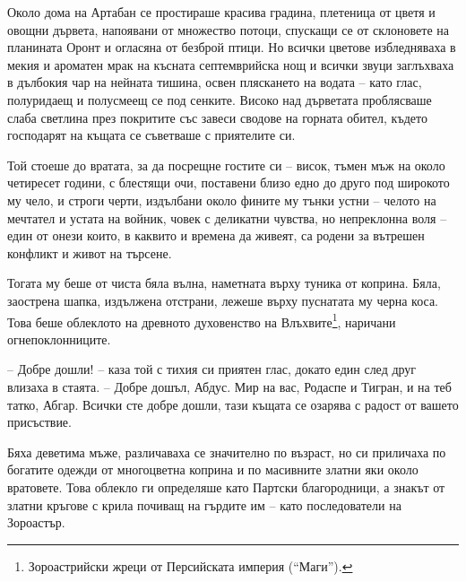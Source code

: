 Около дома на Артабан се простираше красива градина, плетеница от цветя и овощни
дървета, напоявани от множество потоци, спускащи се от склоновете на планината
Оронт и огласяна от безброй птици. Но всички цветове избледняваха в мекия и
ароматен мрак на късната септемврийска нощ и всички звуци заглъхваха в дълбокия
чар на нейната тишина, освен пляскането на водата -- като глас, полуридаещ и
полусмеещ се под сенките. Високо над дърветата проблясваше слаба светлина през
покритите със завеси сводове на горната обител, където господарят на къщата се
съветваше с приятелите си.

Той стоеше до вратата, за да посрещне гостите си -- висок, тъмен мъж на около
четиресет години, с блестящи очи, поставени близо едно до друго под широкото му
чело, и строги черти, издълбани около фините му тънки устни -- челото на
мечтател и устата на войник, човек с деликатни чувства, но непреклонна воля --
един от онези които, в каквито и времена да живеят, са родени за вътрешен
конфликт и живот на търсене.

Тогата му беше от чиста бяла вълна, наметната върху туника от коприна. Бяла,
заострена шапка, издължена отстрани, лежеше върху пуснатата му черна коса. Това
беше облеклото на древното духовенство на Влъхвите\footnote{Зороастрийски жреци
от Персийската империя (``Маги'').}, наричани огнепоклонниците.

-- Добре дошли! -- каза той с тихия си приятен глас, докато един след друг
влизаха в стаята. -- Добре дошъл, Абдус. Мир на вас, Родаспе и Тигран, и на теб
татко, Абгар. Всички сте добре дошли, тази къщата се озарява с радост от
вашето присъствие.

Бяха деветима мъже, различаваха се значително по възраст, но си приличаха по
богатите одежди от многоцветна коприна и по масивните златни яки около
вратовете. Това облекло ги определяше като Партски благородници, а знакът от
златни кръгове с крила почиващ на гърдите им -- като последователи на Зороастър.

